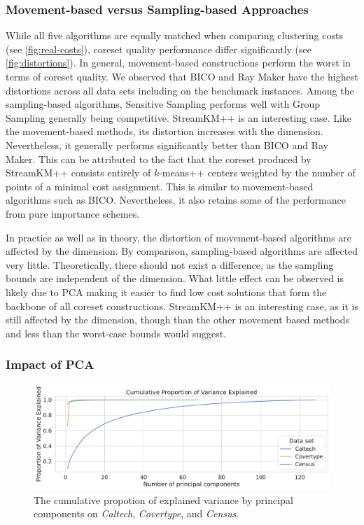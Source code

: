 \subsubsection*{Movement-based versus Sampling-based Approaches}
While all five algorithms are equally matched when comparing clustering costs (see  \cref{fig:real-costs}), coreset quality performance differ significantly (see \cref{fig:distortions}). 
In general, movement-based constructions perform the worst in terms of coreset quality. 
We observed that BICO and Ray Maker have the highest distortions across all data sets including on the benchmark instances. Among the sampling-based algorithms, Sensitive Sampling performs well with Group Sampling generally being competitive. StreamKM++ is an interesting case. Like the movement-based methods, its distortion increases with the dimension. Nevertheless, it generally performs significantly better than BICO and Ray Maker. This can be attributed to the fact that the coreset produced by StreamKM++ consists entirely of $k$-means++ centers weighted by the number of points of a minimal cost assignment. This is similar to movement-based algorithms such as BICO. Nevertheless, it also retains some of the performance from pure importance schemes.

In practice as well as in theory, the distortion of movement-based algorithms are affected by the dimension. By comparison, sampling-based algorithms are affected very little. Theoretically, there should not exist a difference, as the sampling bounds are independent of the dimension. What little effect can be observed is likely due to PCA making it easier to find low cost solutions that form the backbone of all coreset constructions. StreamKM++ is an interesting case, as it is still affected by the dimension, though than the other movement based methods and less than the worst-case bounds would suggest.





\subsubsection*{Impact of PCA}

\begin{figure}
  \caption{The cumulative propotion of explained variance by principal components on \textit{Caltech}, \textit{Covertype}, and \textit{Census}.}
  \label{fig:explained-variance-pca}
  \includegraphics[width=0.9\linewidth]{figures/explained-variance-plot.pdf}
\end{figure}


